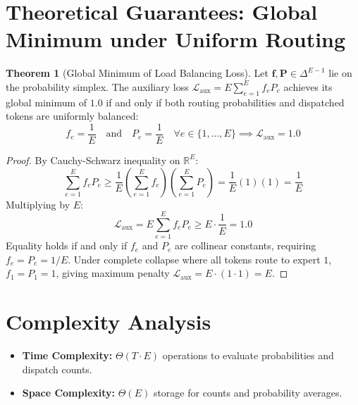 \documentclass[11pt,a4paper]{article}
\theoremstyle{definition}
\newtheorem{theorem}{Theorem}[section]
\begin{document}
\section{Theoretical Guarantees: Global Minimum under Uniform Routing}

\begin{theorem}[Global Minimum of Load Balancing Loss]
\label{thm:moe_aux_min}
Let $\mathbf{f}, \mathbf{P} \in \Delta^{E-1}$ lie on the probability simplex. The auxiliary loss $\mathcal{L}_{\text{aux}} = E \sum_{e=1}^E f_e P_e$ achieves its global minimum of $1.0$ if and only if both routing probabilities and dispatched tokens are uniformly balanced:
\begin{equation}
f_e = \frac{1}{E} \quad \text{and} \quad P_e = \frac{1}{E} \quad \forall e \in \{1, \dots, E\} \implies \mathcal{L}_{\text{aux}} = 1.0
\end{equation}
\end{theorem}

\begin{proof}
By Cauchy-Schwarz inequality on $\mathbb{R}^E$:
\begin{equation}
\sum_{e=1}^E f_e P_e \ge \frac{1}{E} \left( \sum_{e=1}^E f_e \right) \left( \sum_{e=1}^E P_e \right) = \frac{1}{E} (1)(1) = \frac{1}{E}
\end{equation}
Multiplying by $E$:
\begin{equation}
\mathcal{L}_{\text{aux}} = E \sum_{e=1}^E f_e P_e \ge E \cdot \frac{1}{E} = 1.0
\end{equation}
Equality holds if and only if $f_e$ and $P_e$ are collinear constants, requiring $f_e = P_e = 1/E$. Under complete collapse where all tokens route to expert $1$, $f_1 = P_1 = 1$, giving maximum penalty $\mathcal{L}_{\text{aux}} = E \cdot (1 \cdot 1) = E$.
\end{proof}

\section{Complexity Analysis}
\begin{itemize}
    \item \textbf{Time Complexity:} $\Theta(T \cdot E)$ operations to evaluate probabilities and dispatch counts.
    \item \textbf{Space Complexity:} $\Theta(E)$ storage for counts and probability averages.
\end{itemize}
\end{document}
